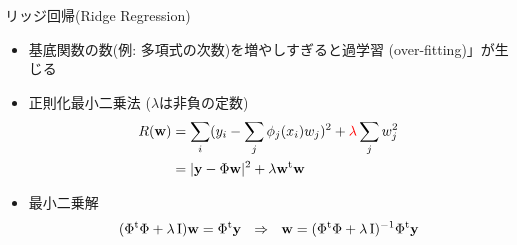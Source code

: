 \begin{frame}[t,fragile]{リッジ回帰(Ridge Regression)}
  \begin{itemize}
  \item 基底関数の数(例: 多項式の次数)を増やしすぎると過学習 (over-fitting)」が生じる
  \item 正則化最小二乗法 ($\lambda$は非負の定数)
    \begin{align*}
    R({\bf w}) &= \sum_i (y_i - \sum_j \phi_j(x_i) w_j)^2 + {\color{red} \lambda} \sum_j w_j^2 \\
    &= | {\bf y} - \Phi {\bf w} |^2 + \lambda {\bf w}^{\rm t} {\bf w}
    \end{align*}
  \item 最小二乗解
    \[
    (\Phi^{\rm t} \Phi + \lambda \, {\rm I}) {\bf w} = \Phi^{\rm t} {\bf y} \ \ \Rightarrow \ \ 
      {\bf w} = (\Phi^{\rm t} \Phi + \lambda \, {\rm I})^{-1}\Phi^{\rm t} {\bf y}
      \]
  \end{itemize}
\end{frame}
